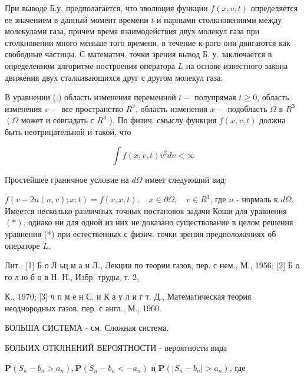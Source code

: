 \documentclass[10pt]{article}
\begin{document}
При выводе Б.у. предполагается, что эволюция функции $f(x, v, t)$ определяется ее значением в данный момент времени $t$ и парными столкновениями между молекулами газа, причем время взаимодействия двух молекул газа при столкновении много меньше того времени, в течение к-рого они двигаются как свободные частицы. С математич. точки зрения вывод Б. у. заключается в определенном алгоритме построения оператора $L$ на основе известного закона движения двух сталкивающихся друг с другом молекул газа.



В уравнении (:) область изменения переменной $t-$ полупрямая $t \geqslant 0$, область изменения $v-$ все пространство $R^{3}$, область изменения $x-$ подобласть $\Omega$ в $R^{3}$ $\left(\Omega\right.$ может и совпадать с $R^{3}$ ). По физич. смыслу функция $f(x, v, t)$ должна быть неотрицательной и такой, что



\[

\int f(x, v, t) v^{2} d v<\infty

\]



Простейшее граничное условие на $d \Omega$ имеет следующий вид:



$f(v-2 n(n, v) ; x ; t)=f(v, x, t), \quad x \in \partial \Omega, \quad v \in R^{3}$, где $n$ - нормаль к $d \Omega$. Имеется несколько различных точных постановок задачи Коши для уравнения $(*)$, однако ни для одной из них не доказано существование в целом решения уравнения (*) при естественных с физич. точки зрения предположениях об операторе $L$.



Лит.: [1] Б о Л ьц м а н Л., Лекции по теории газов, пер. с нем., М., 1956; [2] Б о го л ю б о в Н. Н., Избр. труды, т. 2,

К., 1970; [3] ч п м е н С. и К а у л и г т. Д., Математическая теория неоднородных газов, пер. с англ., М., 1960.



БОЛЬІІІА СИСТЕМА - см. Сложная система.



БОЛЬІИХ ОТКЈІНЕНИЙ ВЕРОЯТНОСТИ - вероятности вида



$\mathbf{P}\left(S_{n}-b_{n}>a_{n}\right), \mathbf{P}\left(S_{n}-b_{n}<-a_{n}\right)$ и $\mathbf{P}\left(\left|S_{n}-b_{n}\right|>a_{n}\right)$, где
\end{document}
